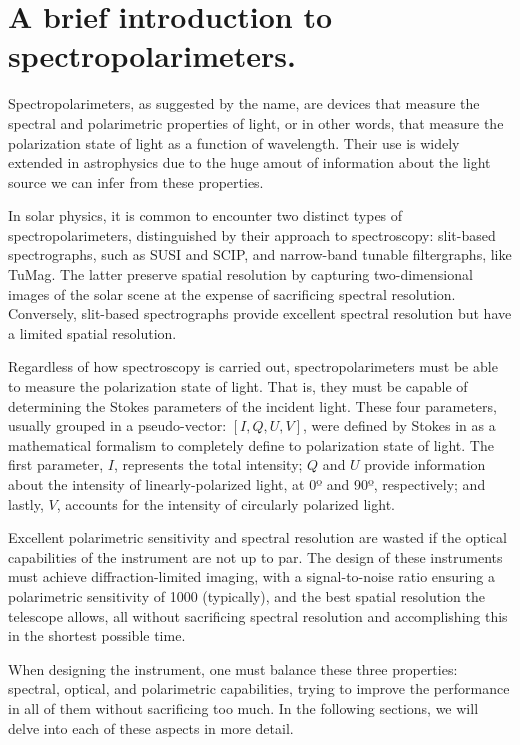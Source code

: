 \section{A brief introduction to spectropolarimeters.}

Spectropolarimeters, as suggested by the name, are devices that measure the spectral and polarimetric properties of light, or in other words, that measure the polarization state of light as a function of wavelength. Their use is widely extended in astrophysics due to the huge amout of information about the light source we can infer from these properties.

In solar physics, it is common to encounter two distinct types of spectropolarimeters, distinguished by their approach to spectroscopy: slit-based spectrographs, such as SUSI and SCIP, and narrow-band tunable filtergraphs, like TuMag. The latter preserve spatial resolution by capturing two-dimensional images of the solar scene at the expense of sacrificing spectral resolution. Conversely, slit-based spectrographs provide excellent spectral resolution but have a limited spatial resolution. 

Regardless of how spectroscopy is carried out, spectropolarimeters must be able to measure the polarization state of light. That is, they must be capable of determining the Stokes parameters  of the incident light. These four parameters, usually grouped in a pseudo-vector: $[I, Q, U, V]$, were defined by Stokes in \cite{Stokes_vector} as a mathematical formalism to completely define to polarization state of light. The first parameter, $I$, represents the total intensity; $Q$ and $U$ provide information about the intensity of linearly-polarized light, at 0º and 90º, respectively; and lastly, $V$, accounts for the intensity of circularly polarized light. 

Excellent polarimetric sensitivity and spectral resolution are wasted if the optical capabilities of the instrument are not up to par. The design of these instruments must achieve diffraction-limited imaging, with a signal-to-noise ratio ensuring a polarimetric sensitivity of 1000 (typically), and the best spatial resolution the telescope allows, all without sacrificing spectral resolution and accomplishing this in the shortest possible time.

When designing the instrument, one must balance these three properties: spectral, optical, and polarimetric capabilities, trying to improve the performance in all of them without sacrificing too much. In the following sections, we will delve into each of these aspects in more detail.

